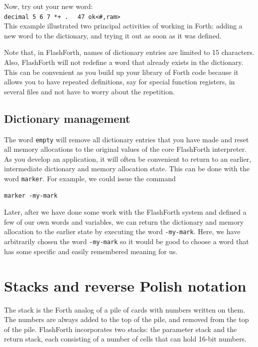\documentclass[12pt,a4paper]{article}
\begin{document}
\medskip
Now, try out your new word: \vspace{7pt} \\
\verb!decimal 5 6 7 *+ . ! \fbox{$\hookleftarrow$} \verb! 47 ok<#,ram>! \vspace{7pt} \\
This example illustrated two principal activities of working in Forth:
adding a new word to the dictionary, and trying it out as soon as it was defined.

\medskip
Note that, in FlashForth, names of dictionary entries are limited to 15 characters.
Also, FlashForth will not redefine a word that already exists in the dictionary.
This can be convenient as you build up your library of Forth code because it allows
you to have repeated definitions, say for special function registers, in several files
and not have to worry about the repetition.

\medskip
\subsection{Dictionary management}
%
The word \verb!empty! will remove all dictionary entries that you have made and
reset all memory allocations to the original values of the core FlashForth interpreter.
As you develop an application, it will often be convenient to return to an earlier, intermediate 
dictionary and memory allocation state. 
This can be done with the word \verb!marker!.
For example, we could issue the command
\begin{verbatim}
marker -my-mark
\end{verbatim}
Later, after we have done some work with the FlashForth system and defined a few of our own words and variables,
we can return the dictionary and memory allocation to the earlier state by executing the word \verb!-my-mark!.
Here, we have arbitrarily chosen the word \verb!-my-mark! so it would be good to choose a word that has
some specific and easily remembered meaning for us.


\bigskip
\section{Stacks and reverse Polish notation}
\label{sec:stacks-and-rpn}
%
The stack is the Forth analog of a pile of cards with numbers written on them.
The numbers are always added to the top of the pile, and removed from the top of the pile.
FlashForth incorporates two stacks: the parameter stack and the return stack,
each consisting of a number of cells that can hold 16-bit numbers.
\end{document}
